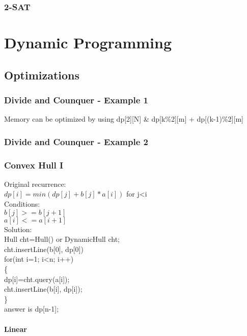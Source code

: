 \documentclass[10pt,a4paper]{report}
\newcommand\tab[1][1cm]{\hspace*{#1}}
\begin{document}
		\subsection{2-SAT}
		
\chapter{Dynamic Programming}

	\section{Optimizations}
		\subsection{Divide and Counquer - Example 1}
			Memory can be optimized by using dp[2][N] \& dp[k\%2][m] + dp[(k-1)\%2][m]\\
			
		\newpage
		\subsection{Divide and Counquer - Example 2}
			
		\newpage
		\subsection{Convex Hull I}
			Original recurrence:\\
			\tab $dp[i]=min(dp[j]+b[j]*a[i])$ for j<i\\
			Conditions:\\
			\tab $b[j]>=b[j+1]$\\
			\tab $a[i]<=a[i+1]$\\
			Solution:\\
			Hull cht=Hull() or DynamicHull cht;\\
			cht.insertLine(b[0], dp[0])\\
			for(int i=1; i<n; i++)\\
			\{\\
				\tab dp[i]=cht.query(a[i]);\\
				\tab cht.insertLine(b[i], dp[i]);\\
			\}\\
			answer is dp[n-1];

			\subsubsection{Linear}
				
			\newpage
\end{document}
